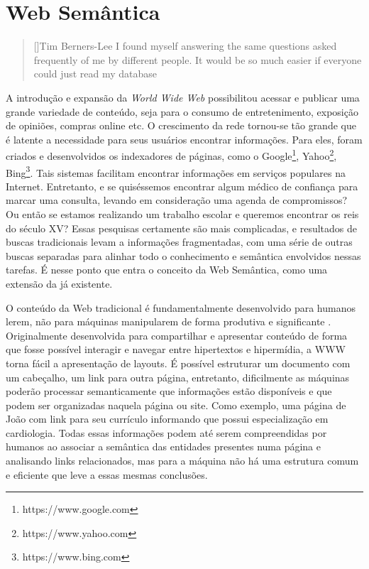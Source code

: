 \chapter{Web Semântica}

\begin{quotation}[]{Tim Berners-Lee}
I found myself answering the same questions asked frequently of me by different people. It would be so much easier if everyone could just read my database
\end{quotation}

A introdução e expansão da \textit{World Wide Web} possibilitou acessar e publicar uma grande variedade de conteúdo, seja para o consumo de entretenimento, exposição de opiniões, compras online etc. O crescimento da rede tornou-se tão grande que é latente a necessidade para seus usuários encontrar informações. Para eles, foram criados e desenvolvidos os indexadores de páginas, como o Google\footnote{https://www.google.com}, Yahoo\footnote{https://www.yahoo.com}, Bing\footnote{https://www.bing.com}. Tais sistemas facilitam encontrar informações em serviços populares na Internet. Entretanto, e se quiséssemos encontrar algum médico de confiança para marcar uma consulta, levando em consideração uma agenda de compromissos? Ou então se estamos realizando um trabalho escolar e queremos encontrar os reis do século XV? Essas pesquisas certamente são mais complicadas, e resultados de buscas tradicionais levam a informações fragmentadas, com uma série de outras buscas separadas para alinhar todo o conhecimento e semântica envolvidos nessas tarefas. É nesse ponto que entra o conceito da Web Semântica, como uma extensão da já existente.

O conteúdo da Web tradicional é fundamentalmente desenvolvido para humanos lerem, não para máquinas manipularem de forma produtiva e significante \citep{bernerslee2001semantic}. Originalmente desenvolvida para compartilhar e apresentar conteúdo de forma que fosse possível interagir e navegar entre hipertextos e hipermídia, a WWW torna fácil a apresentação de layouts. É possível estruturar um documento com um cabeçalho, um link para outra página, entretanto, dificilmente as máquinas poderão processar semanticamente que informações estão disponíveis e que podem ser organizadas naquela página ou site. Como exemplo, uma página de João com link para seu currículo informando que possui especialização em cardiologia. Todas essas informações podem até serem compreendidas por humanos ao associar a semântica das entidades presentes numa página e analisando links relacionados, mas para a máquina não há uma estrutura comum e eficiente que leve a essas mesmas conclusões.

